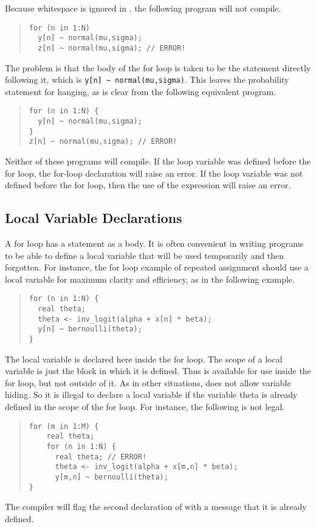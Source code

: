Because whitespace is ignored in \Stan, the following program will
not compile.
%
\begin{quote}
\begin{Verbatim}[fontsize=\small]
for (n in 1:N) 
  y[n] ~ normal(mu,sigma);
  z[n] ~ normal(mu,sigma); // ERROR!
\end{Verbatim}
\end{quote}
%
The problem is that the body of the for loop is taken to be the
statement directly following it, which is 
\Verb|y[n] ~ normal(mu,sigma)|.  This leaves the probability statement for
 hanging, as is clear from the following equivalent
program.
%
\begin{quote}
\begin{Verbatim}[fontsize=\small]
for (n in 1:N) {
  y[n] ~ normal(mu,sigma);
}
z[n] ~ normal(mu,sigma); // ERROR!
\end{Verbatim}
\end{quote}
%
Neither of these programs will compile. If the loop variable 
was defined before the for loop, the for-loop declaration will raise
an error.  If the loop variable  was not defined before the
for loop, then the use of the expression  will raise an
error. 

\subsection{Local Variable Declarations}

A for loop has a statement as a body.  It is often convenient in
writing programs to be able to define a local variable that will be
used temporarily and then forgotten.  For instance, the for loop
example of repeated assignment should use a local variable for maximum
clarity and efficiency, as in the following example.
%
\begin{quote}
\begin{Verbatim}[fontsize=\small]
for (n in 1:N) {
  real theta;
  theta <- inv_logit(alpha + x[n] * beta);
  y[n] ~ bernoulli(theta);
}
\end{Verbatim}
\end{quote}
%
The local variable  is declared here inside the for loop.
The scope of a local variable is just the block in which it is
defined.  Thus  is available for use inside the for loop,
but not outside of it.  As in other situations, \Stan does not allow
variable hiding.  So it is illegal to declare a local variable
 if the variable theta is already defined in the scope of
the for loop.  For instance, the following is not legal.
%
\begin{quote}
\begin{Verbatim}[fontsize=\small]
for (m in 1:M) {
    real theta;
    for (n in 1:N) {
      real theta; // ERROR!
      theta <- inv_logit(alpha + x[m,n] * beta);
      y[m,n] ~ bernoulli(theta);
}
\end{Verbatim}
\end{quote}
%
The compiler will flag the second declaration of  with a
message that it is already defined.

